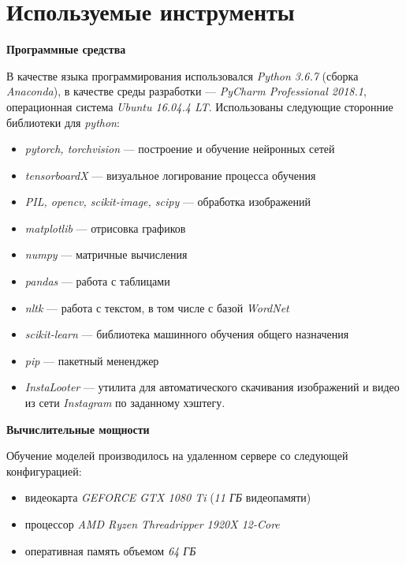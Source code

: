\section{Используемые инструменты}

\textbf{Программные средства}

\indent
В качестве языка программирования использовался
 \textit{Python 3.6.7} (сборка \textit{Anaconda}),
 в качестве среды разработки --- \textit{PyCharm Professional 2018.1},
 операционная система \textit{Ubuntu 16.04.4 LT}. Использованы
 следующие сторонние библиотеки для \textit{python}:


\begin{itemize}

    \item \textit{pytorch, torchvision} --- построение и обучение нейронных сетей
    \item \textit{tensorboardX} --- визуальное логирование процесса обучения 
    \item \textit{PIL, opencv, scikit-image, scipy} --- обработка изображений
    \item \textit{matplotlib} --- отрисовка графиков
    \item \textit{numpy} --- матричные вычисления
    \item \textit{pandas} --- работа с таблицами
    \item \textit{nltk} --- работа с текстом, в том числе с базой \textit{WordNet}
    \item \textit{scikit-learn} --- библиотека машинного обучения общего назначения
    \item \textit{pip} --- пакетный мененджер
    \item \textit{InstaLooter} --- утилита для автоматического скачивания
    изображений и видео из сети \textit{Instagram} по заданному хэштегу.
   
\end{itemize}


\bigskip


\textbf{Вычислительные мощности}

\indent
\indent
Обучение моделей производилось на удаленном сервере со следующей конфигурацией:
\begin{itemize}
    \item видеокарта \textit{GEFORCE GTX 1080 Ti} (\textit{11 ГБ} видеопамяти)
    \item процессор \textit{AMD Ryzen Threadripper 1920X 12-Core}
    \item оперативная память объемом  \textit{64 ГБ}
\end{itemize}

